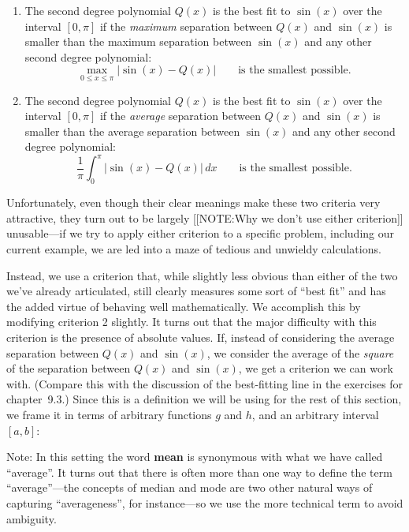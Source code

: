 \begin{enumerate}

\item The second degree polynomial $Q(x)$ is the best fit to $\sin(x)$
  over the interval $[0, \pi]$ if the {\em maximum} separation between
  $Q(x)$ and $\sin(x)$ is smaller than the maximum separation between
  $\sin(x)$ and any other second degree polynomial:
\[
\max_{0\le x\le \pi}|\sin(x)-Q(x)| \qquad \text{is the smallest possible}.
\]

\item The second degree polynomial $Q(x)$ is the best fit to $\sin(x)$
  over the interval $[0, \pi]$ if the {\em average} separation between
  $Q(x)$ and $\sin(x)$ is smaller than the average separation between
  $\sin(x)$ and any other second degree polynomial:
\[
\dfrac{1}{\pi }\int_0^{\pi} |\sin(x)-Q(x)|\, dx \qquad
     \text{is the smallest possible}.
\]

\end {enumerate}
Unfortunately, even though their clear meanings make these two
criteria very attractive, they turn out to be largely [[NOTE:Why we
  don't use either criterion]] unusable---if we try to apply either
criterion to a specific problem, including our current example, we are
led into a maze of tedious and unwieldy calculations.

Instead, we use a criterion that, while slightly less obvious than
either of the two we've already articulated, still clearly measures
some sort of ``best fit'' and has the added virtue of behaving well
mathematically.  We accomplish this by modifying criterion 2 slightly.
It turns out that the major difficulty with this criterion is the
presence of absolute values.  If, instead of considering the average
separation between $Q(x)$ and $\sin(x)$, we consider the average of
the {\em square} of the separation between $Q(x)$ and $\sin(x)$, we
get a criterion we can work with.  (Compare this with the discussion
of the best-fitting line in the exercises for chapter~9.3.)  Since
this is a definition we will be using for the rest of this section, we
frame it in terms of arbitrary functions $g$ and $h$, and an arbitrary
interval $[a, b]$:


\begin{center}

\end{center}
Note: In this setting the word {\bf mean} is synonymous
with what we have called ``average''. It turns out that there is often
more than one way to define the term ``average''---the concepts of
median and mode are two other natural ways of capturing
``averageness'', for instance---so we use the more technical term to
avoid ambiguity.

